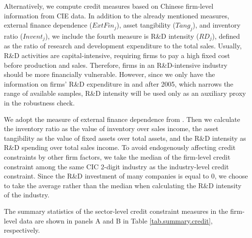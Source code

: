 \documentclass[12pt]{article}
\begin{document}
Alternatively, we compute credit measures based on Chinese firm-level information from CIE data. In addition to the already mentioned measures, external finance dependence ($ExtFin_j$), asset tangibility ($Tang_j$), and inventory ratio ($Invent_j$), we include the fourth measure is R\&D intensity ($RD_j$), defined as the ratio of research and development expenditure to the total sales. Usually, R\&D activities are capital-intensive, requiring firms to pay a high fixed cost before production and sales. Therefore, firms in an R\&D-intensive industry should be more financially vulnerable. However, since we only have the information on firms' R\&D expenditure in and after 2005, which narrows the range of available samples, R\&D intensity will be used only as an auxiliary proxy in the robustness check. 

We adopt the measure of external finance dependence from \cite{fan-lai-li2015}. Then we calculate the inventory ratio as the value of inventory over sales income, the asset tangibility as the value of fixed assets over total assets, and the R\&D intensity as R\&D spending over total sales income. To avoid endogenously affecting credit constraints by other firm factors, we take the median of the firm-level credit constraint among the same CIC 2-digit industry as the industry-level credit constraint. Since the R\&D investment of many companies is equal to 0, we choose to take the average rather than the median when calculating the R\&D intensity of the industry.

The summary statistics of the sector-level credit constraint measures in the firm-level data are shown in panels A and B in Table \ref{tab.summary.credit}, respectively.
\end{document}
